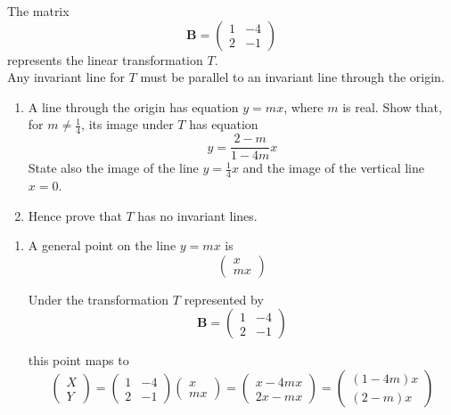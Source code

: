 \documentclass[leqno]{article}
\begin{document}
\begin{enumerate}[
  label=\textbf{\arabic*.},
  leftmargin=*,
  topsep=0pt,
  partopsep=0pt,
  parsep=0pt
]
The matrix
\[
\mathbf{B} = \begin{pmatrix} 1 & -4 \\ 2 & -1 \end{pmatrix}
\]
represents the linear transformation $T$. \\
Any invariant line for $T$ must be parallel to an invariant line through the origin. \\
\begin{enumerate}[label=\textbf{(\alph*)}]
  \item A line through the origin has equation $y=mx$, where $m$ is real. Show that, for $m \ne \tfrac{1}{4}$, its image under $T$ has equation
  \[
  y = \frac{2-m}{1-4m}x
  \]
  State also the image of the line $y=\tfrac{1}{4}x$ and the image of the vertical line $x=0$. \\
  \item Hence prove that $T$ has no invariant lines.  \\
\end{enumerate}

\vspace*{10pt}

\begin{djsSolution}
\begin{enumerate}[label=\textbf{(\alph*)}]
  \item A general point on the line \(y=mx\) is
\[
\begin{pmatrix}x\\mx\end{pmatrix}
\]

Under the transformation \(T\) represented by
\[
\mathbf{B}=\begin{pmatrix}1&-4\\2&-1\end{pmatrix}
\]

this point maps to
\[
\begin{pmatrix}X\\Y\end{pmatrix}
=
\begin{pmatrix}1&-4\\2&-1\end{pmatrix}
\begin{pmatrix}x\\mx\end{pmatrix}
=
\begin{pmatrix}x-4mx\\2x-mx\end{pmatrix}
=
\begin{pmatrix}(1-4m)x\\(2-m)x\end{pmatrix}
\]


\end{enumerate}
\end{djsSolution}
\end{enumerate}
\end{document}

